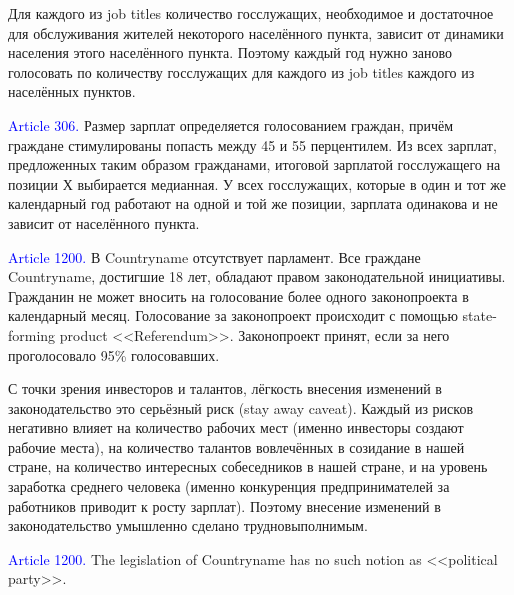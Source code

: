 \documentclass[11pt]{article}
\theoremstyle{remark}
\theoremstyle{definition}
\begin{document}
\color{blue}


Для каждого из job titles количество госслужащих, необходимое и достаточное для обслуживания жителей некоторого населённого пункта, зависит от динамики населения этого населённого пункта. Поэтому каждый год нужно заново голосовать по количеству госслужащих для каждого из job titles каждого из населённых пунктов.

\color{black}








\textcolor{blue}{Article 306.} Размер зарплат определяется голосованием граждан, причём граждане стимулированы попасть между 45 и 55 перцентилем. Из всех зарплат, предложенных таким образом гражданами, итоговой зарплатой госслужащего на позиции Х выбирается медианная. У всех госслужащих, которые в один и тот же календарный год работают на одной и той же позиции, зарплата одинакова и не зависит от населённого пункта.








\textcolor{blue}{Article 1200.} В Countryname отсутствует парламент. Все граждане Countryname, достигшие 18 лет, обладают правом законодательной инициативы. Гражданин не может вносить на голосование более одного законопроекта в календарный месяц. Голосование за законопроект происходит с помощью state-forming product <<Referendum>>. Законопроект принят, если за него проголосовало 95\% голосовавших. 


\color{blue}





С точки зрения инвесторов и талантов, лёгкость внесения изменений в законодательство это серьёзный риск (stay away caveat). Каждый из рисков негативно влияет на количество рабочих мест (именно инвесторы создают рабочие места), на количество талантов вовлечённых в созидание в нашей стране, на количество интересных собеседников в нашей стране, и на уровень заработка среднего человека (именно конкуренция предпринимателей за работников приводит к росту зарплат). Поэтому внесение изменений в законодательство умышленно сделано трудновыполнимым.



\color{black}



\textcolor{blue}{Article 1200.} The legislation of Countryname has no such notion as <<political party>>.
\end{document}
